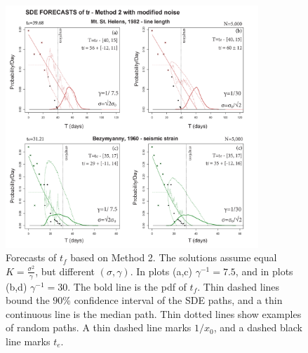 \documentclass{article}
\begin{document}
\begin{figure}[H]
\centering
\includegraphics[width=0.85\textwidth]{Fig12_plus.png}
\caption{Forecasts of $t_f$ based on Method 2. The solutions assume equal $K=\frac{\sigma^2}{\gamma}$, but different $(\sigma, \gamma)$. In plots (a,c) $\gamma^{-1}=7.5$, and in plots (b,d) $\gamma^{-1}=30$. The bold line is the pdf of $t_f$. Thin dashed lines bound the $90\%$ confidence interval of the SDE paths, and a thin continuous line is the median path. Thin dotted lines show examples of random paths. A thin dashed line marks $1/x_0$, and a dashed black line marks $t_e$.}
\label{Fig12}
\end{figure}



\end{document}
